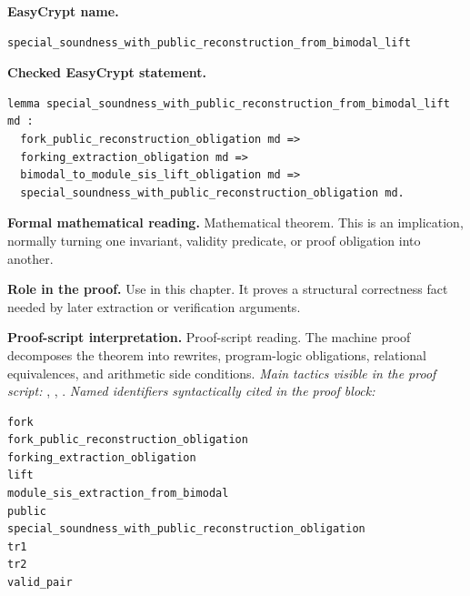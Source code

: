 \begin{formaltheorem}
\noindent\textbf{EasyCrypt name.}
\begin{lstlisting}[language=EasyCrypt,basicstyle=\ttfamily\scriptsize]
special_soundness_with_public_reconstruction_from_bimodal_lift
\end{lstlisting}
\noindent\textbf{Checked EasyCrypt statement.}
\begin{lstlisting}[language=EasyCrypt,basicstyle=\ttfamily\scriptsize]
lemma special_soundness_with_public_reconstruction_from_bimodal_lift md :
  fork_public_reconstruction_obligation md =>
  forking_extraction_obligation md =>
  bimodal_to_module_sis_lift_obligation md =>
  special_soundness_with_public_reconstruction_obligation md.
\end{lstlisting}
\noindent\textbf{Formal mathematical reading.}
Mathematical theorem. This is an implication, normally turning one invariant, validity predicate, or proof obligation into another.

\noindent\textbf{Role in the proof.}
Use in this chapter. It proves a structural correctness fact needed by later extraction or verification arguments.

\noindent\textbf{Proof-script interpretation.}
Proof-script reading. The machine proof decomposes the theorem into rewrites, program-logic obligations, relational equivalences, and arithmetic side conditions.
\emph{Main tactics visible in the proof script:} , , .
\emph{Named identifiers syntactically cited in the proof block:}
\begin{lstlisting}[language=EasyCrypt,basicstyle=\ttfamily\scriptsize]
fork
fork_public_reconstruction_obligation
forking_extraction_obligation
lift
module_sis_extraction_from_bimodal
public
special_soundness_with_public_reconstruction_obligation
tr1
tr2
valid_pair
\end{lstlisting}

\end{formaltheorem}

